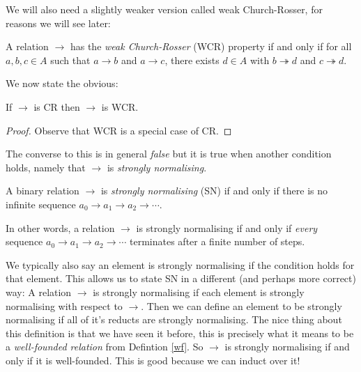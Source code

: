 We will also need a slightly weaker version called weak Church-Rosser, for reasons we will see later:

\begin{defin}
    A relation $\to$ has the \emph{weak Church-Rosser} (WCR) property if and only if for all $a, b, c \in A$ such that $a \to b$ and $a \to c$, there exists $d \in A$ with $b \twoheadrightarrow d$ and $c \twoheadrightarrow d$.
\end{defin}

We now state the obvious:

\begin{cor}\label{cr_is_wcr}
    If $\to$ is CR then $\to$ is WCR.
\end{cor}

\begin{proof}
    Observe that WCR is a special case of CR.
\end{proof}

The converse to this is in general \emph{false} but it is true when another condition holds, namely that $\to$ is \emph{strongly normalising}.

\begin{defin}
    A binary relation $\to$ is \emph{strongly normalising} (SN) if and only if there is no infinite sequence $a_0 \to a_1 \to a_2 \to  \cdots$.
\end{defin}

\begin{remark}
    In other words, a relation $\to$ is strongly normalising if and only if \emph{every} sequence $a_0 \to a_1 \to a_2 \to  \cdots$ terminates after a finite number of steps.
\end{remark}

\begin{remark}
    We typically also say an element is strongly normalising if the condition holds for that element. This allows us to state SN in a different (and perhaps more correct) way: A relation $\to$ is strongly normalising if each element is strongly normalising with respect to $\to$. Then we can define an element to be strongly normalising if all of it's reducts are strongly normalising. The nice thing about this definition is that we have seen it before, this is precisely what it means to be a \emph{well-founded relation} from Defintion \ref{wf}. So $\to$ is strongly normalising if and only if it is well-founded. This is good because we can induct over it!
\end{remark}

